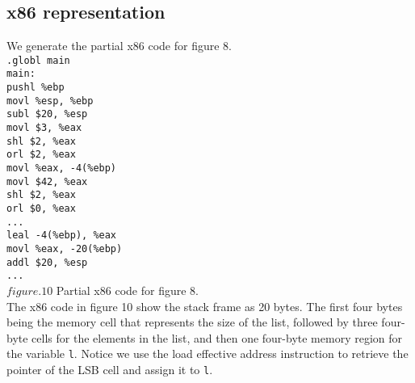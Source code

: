 \documentclass[11pt,article]{amsart}
\theoremstyle{definition}
\newcommand\tab[1][1cm]{\hspace*{#1}}
\numberwithin{equation}{subsection}
\begin{document}
\begin{multicols}{2}
\subsection{x86 representation}
We generate the partial x86 code for figure 8. \\
\texttt{.globl main}\\
\texttt{main:} \\
\tab\texttt{pushl \%ebp} \\
\tab\texttt{movl \%esp, \%ebp} \\
\tab\texttt{subl \$20, \%esp} \\
\tab\texttt{movl \$3, \%eax} \\
\tab\texttt{shl \$2, \%eax} \\
\tab\texttt{orl \$2, \%eax} \\
\tab\texttt{movl \%eax, -4(\%ebp)} \\
\tab\texttt{movl \$42, \%eax} \\
\tab\texttt{shl \$2, \%eax} \\
\tab\texttt{orl \$0, \%eax} \\
\tab\texttt{...} \\
\tab\texttt{leal -4(\%ebp), \%eax} \\
\tab\texttt{movl \%eax, -20(\%ebp)} \\
\tab\texttt{addl \$20, \%esp} \\
\tab\texttt{...}\\
$figure.10$ Partial x86 code for figure 8. \\

The x86 code in figure 10 show the stack frame as 20 bytes. The first four bytes being the memory cell that represents the size of the list, followed by three four-byte cells for the elements in the list, and then one four-byte memory region for the variable \texttt{l}. Notice we use the load effective address instruction to retrieve the pointer of the LSB cell and assign it to \texttt{l}.


\end{multicols}
\end{document}
